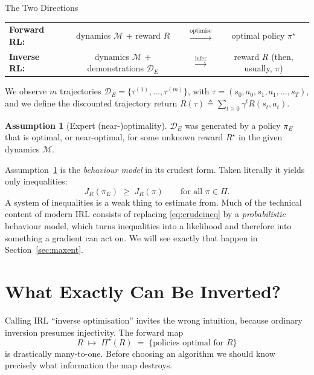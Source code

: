 \documentclass[11pt]{article}
\theoremstyle{plain}
\theoremstyle{definition}
\newtheorem{assumption}[theorem]{Assumption}
\theoremstyle{remark}
\begin{document}
\begin{graybox}{The Two Directions}
\begin{center}
\small\setlength{\tabcolsep}{4pt}%
\begin{tabular}{@{}lccc@{}}
\textbf{Forward RL:} & dynamics $\mathcal{M}$ + reward $R$ &
$\xrightarrow{\text{optimise}}$ & optimal policy $\pi^\star$\\[4pt]
\textbf{Inverse RL:} & dynamics $\mathcal{M}$ + demonstrations $\mathcal{D}_E$ &
$\xrightarrow{\text{infer}}$ & reward $R$ (then, usually, $\pi$)
\end{tabular}
\end{center}
\end{graybox}

We observe $m$ trajectories $\mathcal{D}_E =
\{\tau^{(1)},\ldots,\tau^{(m)}\}$, with $\tau=(s_0,a_0,s_1,a_1,\ldots,s_T)$,
and we define the discounted trajectory return $R(\tau) \triangleq
\sum_{t\ge0}\gamma^t R(s_t,a_t)$.

\begin{assumption}[Expert (near-)optimality]\label{ass:expert}
$\mathcal{D}_E$ was generated by a policy $\pi_E$ that is optimal, or
near-optimal, for some unknown reward $R^\star$ in the given dynamics
$\mathcal{M}$.
\end{assumption}

Assumption~\ref{ass:expert} is the \emph{behaviour model} in its crudest
form. Taken literally it yields only inequalities:
\begin{equation}
J_R(\pi_E) \;\ge\; J_R(\pi) \qquad \text{for all } \pi\in\Pi.
\label{eq:crudeineq}
\end{equation}
A system of inequalities is a weak thing to estimate from. Much of the
technical content of modern IRL consists of replacing \eqref{eq:crudeineq}
by a \emph{probabilistic} behaviour model, which turns inequalities into a
likelihood and therefore into something a gradient can act on. We will see
exactly that happen in Section~\ref{sec:maxent}.

\section{What Exactly Can Be Inverted?}
\label{sec:invertible}

Calling IRL ``inverse optimisation'' invites the wrong intuition, because
ordinary inversion presumes injectivity. The forward map
\begin{equation}
R \;\longmapsto\; \Pi^\star(R) \;=\; \{\text{policies optimal for } R\}
\label{eq:forwardmap}
\end{equation}
is drastically many-to-one. Before choosing an algorithm we should know
precisely what information the map destroys.
\end{document}
